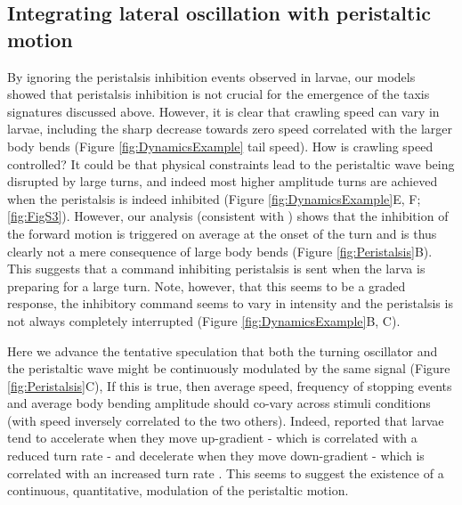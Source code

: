 \documentclass[11pt,a4paper]{article}
\begin{document}
\subsection{Integrating lateral oscillation with peristaltic motion}
By ignoring the peristalsis inhibition events observed in larvae, our models showed that peristalsis inhibition is not crucial for the emergence of the taxis signatures discussed above. However, it is clear that crawling speed can vary in larvae, including the sharp decrease towards zero speed correlated with the larger body bends (Figure \ref{fig:DynamicsExample} tail speed). How is crawling speed controlled? It could be that physical constraints lead to the peristaltic wave being disrupted by large turns, and indeed most higher amplitude turns are achieved when the peristalsis is indeed inhibited (Figure \ref{fig:DynamicsExample}E, F; \ref{fig:FigS3}). However, our analysis (consistent with \citet{gepner2015computations,hernandez2015reverse}) shows that the inhibition of the forward motion is triggered on average at the onset of the turn and is thus clearly not a mere consequence of large body bends (Figure \ref{fig:Peristalsis}B). This suggests that a  command inhibiting peristalsis is sent when the larva is preparing for a large turn. Note, however, that this seems to be a graded response, the inhibitory command seems to vary in intensity and the peristalsis is not always completely interrupted (Figure \ref{fig:DynamicsExample}B, C).

Here we advance the tentative speculation that both the turning oscillator and the peristaltic wave might be continuously modulated by the same signal (Figure \ref{fig:Peristalsis}C), 
If this is true, then average speed, frequency of stopping events and average body bending amplitude should co-vary across stimuli conditions (with speed inversely correlated to the two others). Indeed, \cite{gomez2014multilevel} reported that larvae tend to accelerate when they move up-gradient - which is correlated with a reduced turn rate \citep{schleyer2015learning} - and decelerate when they move down-gradient - which is correlated with an increased turn rate \citep{schleyer2015learning}. This seems to suggest the existence of a continuous, quantitative, modulation of the peristaltic motion. 
\end{document}
